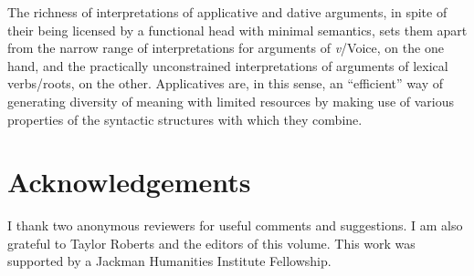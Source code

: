 \documentclass[output=paper,colorlinks,citecolor=brown,nonflat]{./langscibook}
\begin{document}
The richness of interpretations of applicative and dative arguments, in spite of their being licensed by a functional head with minimal semantics, sets them apart from the narrow range of interpretations for arguments of \textit{v}/Voice, on the one hand, and the practically unconstrained interpretations of arguments of lexical verbs/roots, on the other. Applicatives are, in this sense, an “efficient” way of generating diversity of meaning with limited resources by making use of various properties of the syntactic structures with which they combine.

\section*{Acknowledgements}

I thank two anonymous reviewers for useful comments and suggestions. I am also grateful to Taylor Roberts and the editors of this volume. This work was supported by a Jackman Humanities Institute Fellowship. 

\sloppy\printbibliography[heading=subbibliography,notkeyword=this]
\end{document}
